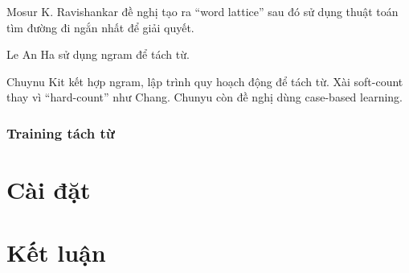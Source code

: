 \documentclass[a4paper]{book}
\begin{document}
Mosur K. Ravishankar đề nghị tạo ra ``word lattice'' sau đó sử dụng
thuật toán tìm đường đi ngắn nhất để giải quyết.

Le An Ha sử dụng ngram để tách từ.

Chuynu Kit kết hợp ngram, lập trình quy hoạch động để tách từ. Xài
soft-count thay vì ``hard-count'' như Chang. Chunyu còn đề nghị dùng
case-based learning.


\subsection{Training tách từ}





\chapter{Cài đặt}


\chapter{Kết luận}
\label{cha:conclusion}
\end{document}
